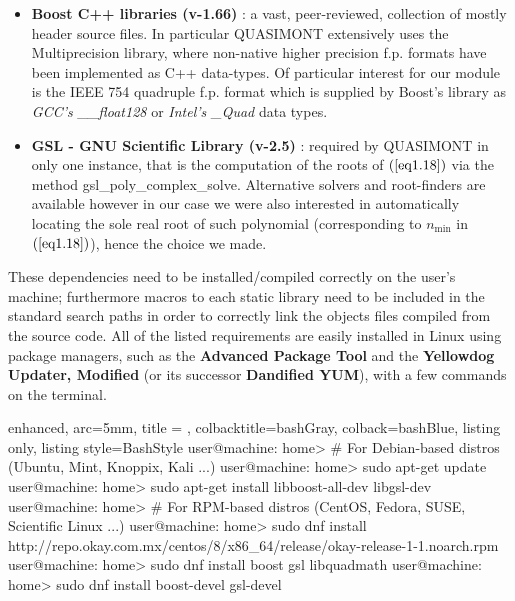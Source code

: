 \documentclass[a4paper, twosided]{book}
\begin{document}
\begin{itemize}
    \item \color{poliDarkBlue} \textbf{Boost C++ libraries (v-1.66)} \color{black}\cite{boost}: a vast, peer-reviewed, collection of mostly header source files. In particular QUASIMONT extensively uses the \colorbox{poliGrayBlue}{Multiprecision} library, where non-native higher precision f.p. formats have been implemented as C++ data-types. Of particular interest for our module is the IEEE 754 quadruple f.p. format which is supplied by Boost's library as {\itshape GCC's \_\_float128} or {\itshape Intel's \_Quad} data types.
    \item \color{poliDarkBlue} \textbf{GSL - GNU Scientific Library (v-2.5)} \color{black}\cite{gsl}: required by QUASIMONT in only one instance, that is the computation of the roots of $(\ref{eq1.18})$ via the method \colorbox{poliGrayBlue}{gsl\_poly\_complex\_solve}. Alternative solvers and root-finders are available however in our case we were also interested in automatically locating the sole real root of such polynomial (corresponding to $n_{\text{min}}$ in $(\ref{eq1.18})$), hence the choice we made.
\end{itemize}

\noindent
These dependencies need to be installed/compiled correctly on the user's machine; furthermore macros to each static library need to be included in the standard search paths in order to correctly link the objects files compiled from the source code. All of the listed requirements are easily installed in Linux using package managers, such as the \color{poliDarkBlue} \textbf{Advanced Package Tool} \color{black} and the \color{poliDarkBlue} \textbf{Yellowdog Updater, Modified} \color{black} (or its successor \color{poliDarkBlue} \textbf{Dandified YUM}\color{black}), with a few commands on the terminal.

\vspace{0.5cm}
\begin{tcblisting}{enhanced,
                   arc=5mm,
                   title = \color{black}{\large \ttfamily Installation of third-party libraries},
                   colbacktitle=bashGray,
                   colback=bashBlue,
                   listing only,
                   listing style=BashStyle}
user@machine: home> # For Debian-based distros (Ubuntu, Mint, Knoppix, Kali ...)
user@machine: home> sudo apt-get update
user@machine: home> sudo apt-get install libboost-all-dev libgsl-dev
user@machine: home> # For RPM-based distros (CentOS, Fedora, SUSE, Scientific Linux ...)
user@machine: home> sudo dnf install http://repo.okay.com.mx/centos/8/x86_64/release/okay-release-1-1.noarch.rpm
user@machine: home> sudo dnf install boost gsl libquadmath
user@machine: home> sudo dnf install boost-devel gsl-devel
\end{tcblisting}
\vspace{0.5cm}
\end{document}
